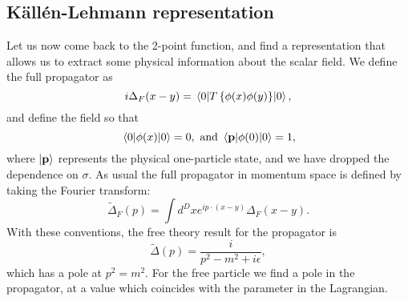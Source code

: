 \documentclass{article}
\numberwithin{equation}{section}
\begin{document}
\subsection{Källén-Lehmann representation}
Let us now come back to the 2-point function, and find a representation that allows us to extract some physical information about the scalar field. We define the full propagator as 
\begin{equation}
    i\Delta_F(x-y) = \ev{T\left\{\phi(x) \phi(y)\right\}}{0},
\end{equation}
and define the field so that 
\begin{equation} \label{eq:conventions}
    \ev{\phi(x)}{0} = 0, \text{ and } \mel{\vb{p}}{\phi(0)}{0} = 1,
\end{equation}
where $\ket{\vb{p}}$ represents the physical one-particle state, and we have dropped the dependence on $\sigma$. As usual the full propagator in momentum space is defined by taking the Fourier transform:
\begin{equation}
    \tilde{\Delta}_F(p) = \int d^Dx e^{ip \cdot (x-y)} \Delta_F(x-y).
\end{equation}
With these conventions, the free theory result for the propagator is 
\begin{equation}
    \tilde{\Delta}(p) = \frac{i}{p^2-m^2+i\epsilon},
\end{equation}
which has a pole at $p^2=m^2$. For the free particle we find a pole in the propagator, at a value which coincides with the parameter in the Lagrangian.
\end{document}

